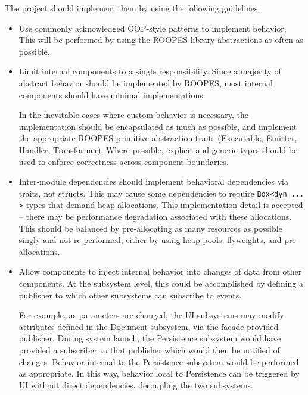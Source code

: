 The project should implement them by using the following guidelines:
\begin{itemize}
    \item {
          Use commonly acknowledged OOP-style patterns to implement behavior.
          This will be performed by using the ROOPES library abstractions as often as possible.
          }
    \item {
          Limit internal components to a single responsibility.
          Since a majority of abstract behavior should be implemented by ROOPES, most internal components should have minimal implementations.

          In the inevitable cases where custom behavior is necessary, the implementation should be encapsulated as much as possible, and implement the appropriate ROOPES primitive abstraction traits (Executable, Emitter, Handler, Transformer).
          Where possible, explicit and generic types should be used to enforce correctness across component boundaries.
          }
    \item {
          Inter-module dependencies should implement behavioral dependencies via traits, not structs.
          This may cause some dependencies to require \texttt{Box<dyn ... >} types that demand heap allocations.
          This implementation detail is accepted -- there may be performance degradation associated with these allocations.
          This should be balanced by pre-allocating as many resources as possible singly and not re-performed, either by using heap pools, flyweights, and pre-allocations.
          }
    \item {
          Allow components to inject internal behavior into changes of data from other components.
          At the subsystem level, this could be accomplished by defining a publisher to which other subsystems can subscribe to events.

          For example, as parameters are changed, the UI subsystems may modify attributes defined in the Document subsystem, via the facade-provided publisher.
          During system launch, the Persistence subsystem would have provided a subscriber to that publisher which would then be notified of changes.
          Behavior internal to the Persistence subsystem would be performed as appropriate.
          In this way, behavior local to Persistence can be triggered by UI without direct dependencies, decoupling the two subsystems.
          }
\end{itemize}